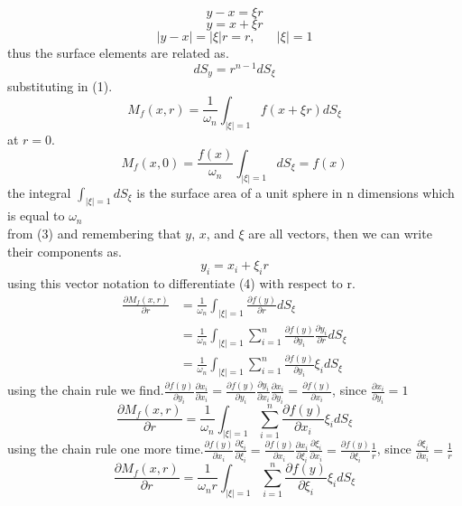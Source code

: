 \documentclass[]{article}
\begin{document}
\[
    y-x = \xi r    
\]
\begin{equation}
y = x + \xi r
\end{equation}
\[
    |y-x| = |\xi|r = r, \;\;\;\;\;\; |\xi| = 1    
\]
thus the surface elements are related as.
\[
    dS_y = r^{n-1} dS_\xi    
\]
substituting in (1).
\begin{equation}
M_{f}(x,r) = \frac{1}{\omega_{n}} \int_{|\xi|=1} f(x+\xi r)dS_\xi
\end{equation} 
at $r = 0$. 
\begin{equation}
M_{f}(x,0) = \frac{f(x)}{\omega_{n}} \int_{|\xi|=1} dS_\xi = f(x)
\end{equation}
the integral $\displaystyle \int_{|\xi|=1} dS_\xi$ is the surface area of a unit sphere in n dimensions which is equal to $\omega_n$
\\
from (3) and remembering that $y$, $x$, and $\xi$ are all vectors, then we can write their components as.
\[
    y_i = x_i + \xi_i r    
\]
using this vector notation to differentiate (4) with respect to r.
\begin{align*}
\frac{\partial M_f (x,r)}{\partial r} &= \frac{1}{\omega_n} \int_{|\xi|=1} \frac{\partial f(y)}{\partial r}dS_\xi
\\
&= \frac{1}{\omega_n} \int_{|\xi|=1} \sum_{i=1}^{n} \frac{\partial f(y)}{\partial y_i}\frac{\partial y_i}{\partial r} dS_\xi
\\
&= \frac{1}{\omega_n} \int_{|\xi|=1} \sum_{i=1}^{n} \frac{\partial f(y)}{\partial y_i}\xi_i dS_\xi
\end{align*}
using the chain rule we find.$\displaystyle \frac{\partial f(y)}{\partial y_i} \frac{\partial x_i}{\partial x_i} = \frac{\partial f(y)}{\partial y_i} \frac{\partial y_i}{\partial x_i}\frac{\partial x_i}{\partial y_i} = \frac{\partial f(y)}{\partial x_i}$, since $\displaystyle \frac{\partial x_i}{\partial y_i} = 1$
\[
    \frac{\partial M_f (x,r)}{\partial r} = \frac{1}{\omega_n} \int_{|\xi|=1} \sum_{i=1}^{n} \frac{\partial f(y)}{\partial x_i}\xi_i dS_\xi    
\]
using the chain rule one more time.$\displaystyle \frac{\partial f(y)}{\partial x_i} \frac{\partial \xi_i}{\partial \xi_i}= \frac{\partial f(y)}{\partial x_i}\frac{\partial x_i}{\partial \xi_i}\frac{\partial \xi_i}{\partial x_i} = \frac{\partial f(y)}{\partial \xi_i}\frac{1}{r}$, since $\displaystyle \frac{\partial \xi_i}{\partial x_i} = \frac{1}{r}$
\begin{equation}
\frac{\partial M_f (x,r)}{\partial r} = \frac{1}{\omega_n r} \int_{|\xi|=1} \sum_{i=1}^{n} \frac{\partial f(y)}{\partial \xi_i}\xi_i dS_\xi
\end{equation}
\end{document}
